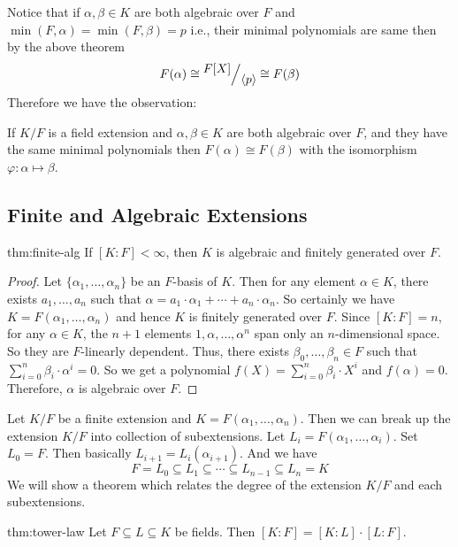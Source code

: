 Notice that if $\alpha,\beta\in K$ are both algebraic over $F$ and $\min(F,\alpha)=\min(F,\beta)=p$ i.e., their minimal polynomials are same then by the above theorem $$F(\alpha)\cong\quotient{F[X]}{\la p\ra}\cong F(\beta)$$
Therefore we have the observation:
\begin{observation}
  If $K/F$ is a field extension and $\alpha,\beta\in K$ are both algebraic over $F$, and they have the same minimal polynomials then $F(\alpha)\cong F(\beta)$ with the isomorphism $\varphi:\alpha\mapsto \beta$. 
\end{observation}
\subsection{Finite and Algebraic Extensions}

\begin{lemma}{}{thm:finite-alg}
  If $[K:F]<\infty$, then $K$ is algebraic and finitely generated over $F$.
\end{lemma}

\begin{proof}
  Let $\{\alpha_1,\ldots,\alpha_n\}$ be an $F$-basis of $K$. 
  Then for any element $\alpha\in K$, there exists $a_1,\dots, a_n$ such that $\alpha=a_1\cdot \alpha_1+\cdots +a_n\cdot \alpha_n$. 
  So certainly we have $K=F(\alpha_1,\dots, \alpha_n)$ and hence $K$ is finitely generated over $F$. 
  Since $[K\colon F]=n$, for any $\alpha\in K$, the $n+1$ elements $1,\alpha,\ldots,\alpha^n$ span only an $n$-dimensional space. 
  So they are $F$-linearly dependent. 
  Thus, there exists $\beta_0,\dots, \beta_n\in F$ such that $\sum_{i=0}^n\beta_i\cdot \alpha^i=0$. So we get a polynomial $f(X)=\sum_{i=0}^n \beta_i\cdot X^i$ and $f(\alpha)=0$. 
  Therefore, $\alpha$ is algebraic over $F$. 
\end{proof}

Let $K/F$ be a finite extension and $K=F(\alpha_1,\dots, \alpha_n)$.  
Then we can break up the extension $K/F$ into collection of subextensions. 
Let $L_i=F(\alpha_1,\dots,\alpha_i)$. 
Set $L_0=F$. 
Then basically $L_{i+1}=L_i(\alpha_{i+1})$. 
And we have $$F=L_0\subseteq L_1\subseteq \cdots \subseteq L_{n-1}\subseteq L_n=K$$
We will show a theorem which relates the degree of the extension $K/F$ and each subextensions. 

\begin{Theorem}{}{thm:tower-law}
  Let $F\subseteq L\subseteq K$ be fields. Then $[K:F]=[K:L]\cdot[L:F]$.
\end{Theorem}

